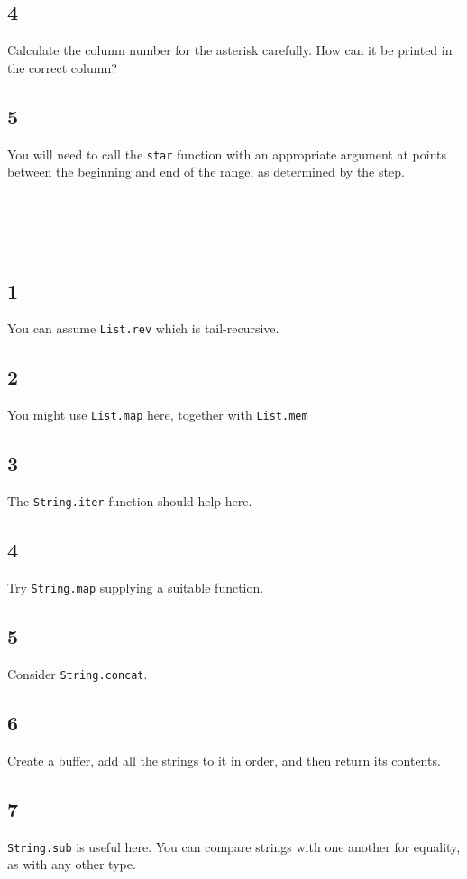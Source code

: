 \documentclass[]{book}
\begin{document}
\begin{multicols*}{2}
\subsection*{4}
Calculate the column number for the asterisk carefully. How can it be printed in the correct column?

\subsection*{5}
You will need to call the \texttt{star} function with an appropriate argument at points between the beginning and end of the range, as determined by the step.

\section*{\\ }
\subsection*{1}You can assume \texttt{List.rev} which is tail-recursive.
\subsection*{2}You might use \texttt{List.map} here, together with \texttt{List.mem}
\subsection*{3}The \texttt{String.iter} function should help here.
\subsection*{4}Try \texttt{String.map} supplying a suitable function.
\subsection*{5}Consider \texttt{String.concat}.
\subsection*{6}Create a buffer, add all the strings to it in order, and then return its contents.
\subsection*{7}\texttt{String.sub} is useful here. You can compare strings with one another for equality, as with any other type.


\end{multicols*}
\end{document}
